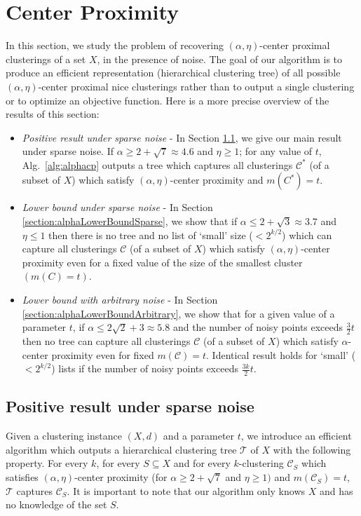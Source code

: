 \documentclass[12pt]{article}
\newcommand{\mc}{\mathcal}
\begin{document}
\section{Center Proximity}
\label{section:cp}

In this section, we study the problem of recovering $(\alpha, \eta)$-center proximal clusterings of a set $X$, in the presence of noise. The goal of our algorithm is to produce an efficient representation (hierarchical clustering tree) of all possible $(\alpha, \eta)$-center proximal nice clusterings rather than to output a single clustering or to optimize an objective function. Here is a more precise overview of the results of this section: 
\begin{itemize}[nolistsep,noitemsep,leftmargin=*]
\item  {\it Positive result under sparse noise} - In Section \ref{section:positiveResultSparseNoise}, we give our main result under sparse noise. If $\alpha \ge 2 + \sqrt{7} \approx 4.6$ and $\eta \ge 1$; for any value of $t$, Alg.~\ref{alg:alphacp} outputs a tree which captures all clusterings $\mc C^*$ (of a subset of $X$) which satisfy $(\alpha, \eta)$-center proximity and $m(C^*)=t$.
\item  {\it Lower bound under sparse noise} - In Section \ref{section:alphaLowerBoundSparse}, we show that if $\alpha \le 2 + \sqrt{3} \approx 3.7$ and $\eta \le 1$ then there is no tree and no list of `small' size ($< 2^{k/2}$) which can capture all clusterings $\mc C$ (of a subset of $X$) which satisfy $(\alpha, \eta)$-center proximity even for a fixed value of the size of the smallest cluster $(m(C) = t)$.
\item {\it Lower bound with arbitrary noise} - In Section \ref{section:alphaLowerBoundArbitrary}, we show that for a given value of a parameter $t$, if $\alpha \le 2\sqrt{2} + 3 \approx 5.8$ and the number of noisy points exceeds $\frac{3}{2}t$ then no tree can capture all clusterings $\mc C$ (of a subset of $X$) which satisfy $\alpha$-center proximity even for fixed $m(\mc C) = t$. Identical result holds for `small' ($<2^{k/2}$) lists if the number of noisy points exceeds $\frac{3k}{2}t$.
\end{itemize} 

\subsection{Positive result under sparse noise}
\label{section:positiveResultSparseNoise}
Given a clustering instance $(X, d)$ and a parameter $t$, we introduce an efficient algorithm which outputs a hierarchical clustering tree $\mc T$ of $X$ with the following property. For every $k$, for every $S \subseteq X$ and for every $k$-clustering $\mc C_{S}$ which satisfies $(\alpha, \eta)$-center proximity (for $\alpha \ge 2 + \sqrt{7}$ and $ \eta \ge 1)$ and $m(\mc C_{S}) = t$, $\mc T$ captures $\mc C_{S}$. It is important to note that our algorithm only knows $X$ and has no knowledge of the set $S$.
\end{document}
